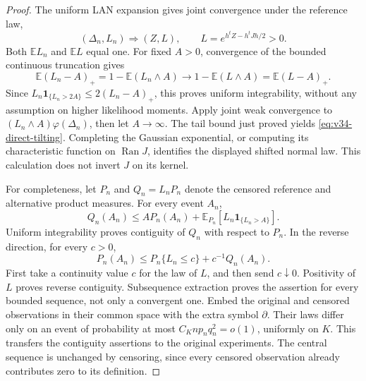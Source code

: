 \begin{proof}
The uniform LAN expansion gives joint convergence under the reference law,
\[
 (\Delta_n,L_n)\Rightarrow
 (Z,L),\qquad L=e^{h^tZ-h^tJh/2}>0.
\]
Both \(\mathbb E L_n\) and \(\mathbb E L\) equal one.  For fixed
\(A>0\), convergence of the bounded continuous truncation gives
\[
 \mathbb E(L_n-A)_+=1-\mathbb E(L_n\wedge A)
        \longrightarrow1-\mathbb E(L\wedge A)=\mathbb E(L-A)_+.
\]
Since \(L_n\mathbf1_{\{L_n>2A\}}\le2(L_n-A)_+\), this proves uniform
integrability, without any assumption on higher likelihood moments.
Apply joint weak convergence to
\((L_n\wedge A)\varphi(\Delta_n)\), then let \(A\to\infty\).
The tail bound just proved yields \eqref{eq:v34-direct-tilting}.
Completing the Gaussian exponential, or computing its characteristic
function on \(\operatorname{Ran}J\), identifies the displayed shifted
normal law.  This calculation does not invert \(J\) on its kernel.

For completeness, let \(P_n\) and \(Q_n=L_nP_n\) denote the censored
reference and alternative product measures.  For every event \(A_n\),
\[
 Q_n(A_n)\le A P_n(A_n)
           +\mathbb E_{P_n}[L_n\mathbf1_{\{L_n>A\}}].
\]
Uniform integrability proves contiguity of \(Q_n\) with respect to \(P_n\).
In the reverse direction, for every \(c>0\),
\[
 P_n(A_n)\le P_n\{L_n\le c\}+c^{-1}Q_n(A_n).
\]
First take a continuity value \(c\) for the law of \(L\), and then send
\(c\downarrow0\).  Positivity of \(L\) proves reverse contiguity.
Subsequence extraction proves the assertion for every bounded sequence,
not only a convergent one.  Embed the original and censored observations in
their common space with the extra symbol \(\partial\).  Their laws differ
only on an event of probability at most \(C_Knp_nq_n^2=o(1)\), uniformly
on \(K\).  This transfers the contiguity assertions to the original
experiments.  The central sequence is unchanged by censoring, since every
censored observation already contributes zero to its definition.


\end{proof}
